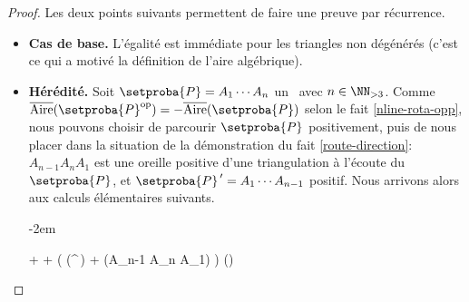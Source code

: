 \begin{proof}
    Les deux points suivants permettent de faire une preuve par récurrence.

    \begin{itemize}
		\item \textbf{Cas de base.}
		L'égalité est immédiate pour les triangles non dégénérés (c'est ce qui a motivé la définition de l'aire algébrique).


		\item \textbf{Hérédité.}
		Soit $\setproba{P} = A_1 \cdots A_n$ un \ngone\ avec $n \in \NN_{>3}$.
		Comme $\sarea{\setproba{P}^{\mathrm{op}}} = - \sarea{\setproba{P}}$ selon le fait \ref{nline-rota-opp}, nous pouvons choisir de parcourir $\setproba{P}$ positivement, puis de nous placer dans la situation de la démonstration du fait \ref{route-direction}:
		$A_{n-1} A_n A_1$ est une oreille positive d'une triangulation à l'écoute du \ngone\ $\setproba{P}$,
		et
		$\setproba{P}^{\,\prime} = A_1 \cdots A_{n-1}$ positif.
		Nous arrivons alors aux calculs élémentaires suivants.
		
		\leavevmode\kern-2em%
		\begin{stepcalc}[style=ar*]
		          {}
		     + 
		          {}
		      +  
		          {}
		     \big( \mu(^{\,\prime}) + \mu(A_{n-1} A_n A_1) \big)
		          {}
		     \mu()
		          {}
		     
		\explnext{}
		\end{stepcalc}
    \end{itemize}
    
    \null\vspace{-3.5ex}
\end{proof}








